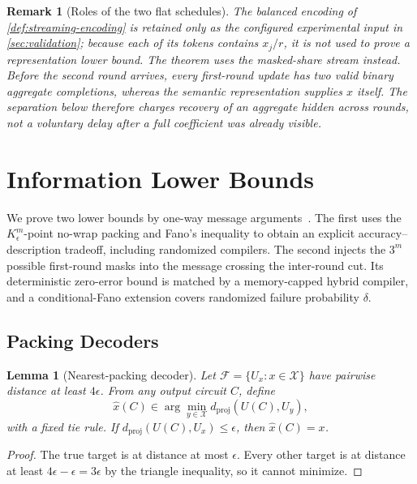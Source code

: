 \documentclass[aps,prx,reprint,floatfix,superscriptaddress]{revtex4-2}
\newtheorem{lemma}{Lemma}
\newtheorem{remark}{Remark}
\begin{document}
\begin{remark}[Roles of the two flat schedules]
\label{rem:dispersal}
The balanced encoding of \cref{def:streaming-encoding} is retained only as
the configured experimental input in \cref{sec:validation}; because each
of its tokens contains $x_j/r$, it is not used to prove a representation
lower bound.  The theorem uses the masked-share stream instead.  Before the
second round arrives, every first-round update has two valid binary
aggregate completions, whereas the semantic representation supplies $x$
itself.  The separation below therefore charges recovery of an aggregate
hidden across rounds, not a voluntary delay after a full coefficient was
already visible.
\end{remark}


\section{Information Lower Bounds}
\label{sec:reduction}

We prove two lower bounds by one-way message arguments~\cite{kushilevitz1997communication}.
The first uses the $K_\epsilon^m$-point no-wrap packing and Fano's inequality
to obtain an explicit accuracy--description tradeoff, including randomized
compilers.  The second injects the $3^m$ possible first-round masks into the
message crossing the inter-round cut.  Its deterministic zero-error bound is
matched by a memory-capped hybrid compiler, and a conditional-Fano extension
covers randomized failure probability $\delta$.

\subsection{Packing Decoders}

\begin{lemma}[Nearest-packing decoder]
\label{lem:nearest-decoder}
Let $\mathcal F=\{U_x:x\in\mathcal X\}$ have pairwise distance at least
$4\epsilon$.  From any output circuit $C$, define
\begin{equation*}
 \widehat x(C)\in\arg\min_{y\in\mathcal X}
       d_{\mathrm{proj}}(U(C),U_y),
\end{equation*}
with a fixed tie rule.  If
$d_{\mathrm{proj}}(U(C),U_x)\leq\epsilon$, then $\widehat x(C)=x$.
\end{lemma}

\begin{proof}
The true target is at distance at most $\epsilon$.  Every other target is
at distance at least $4\epsilon-\epsilon=3\epsilon$ by the triangle
inequality, so it cannot minimize.
\end{proof}
\end{document}
